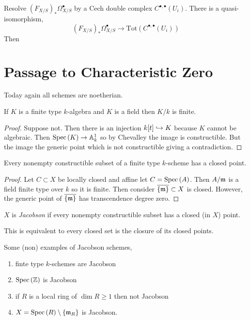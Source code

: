 \documentclass[12pt]{article}
\begin{document}
Resolve $(F_{X/S})_* \Omega^\bullet_{X/S}$ by a Cech double complex $C^{\bullet, \bullet}(U_i)$. There is a quasi-isomorphism,
\[ (F_{X/S})_* \Omega_{X/S}^\bullet \to \mathrm{Tot}\left( C^{\bullet, \bullet}(U_i) \right) \]
Then


\section{Passage to Characteristic Zero}

\begin{rmk}
Today again all schemes are noetherian.
\end{rmk}

\begin{prop}[Nullstellensatz]
If $K$ is a finite type $k$-algebra and $K$ is a field then $K/k$ is finite.
\end{prop}

\begin{proof}
Suppose not. Then there is an injection $k[t] \hookrightarrow K$ because $K$ cannot be algebraic. Then $\mathrm{Spec}\left( K \right) \to \mathbb{A}^1_k$ so by Chevalley the image is constructible. But the image the generic point which is not constructible giving a contradiction. 
\end{proof}

\begin{cor}
Every nonempty constructible subset of a finite type $k$-scheme has a closed point.
\end{cor}

\begin{proof}
Let $C \subset X$ be locally closed and affine let $C = \mathrm{Spec}\left( A \right)$. Then $A / \mathfrak{m}$ is a field finite type over $k$ so it is finite. Then consider $\overline{\{ \mathfrak{m} \}} \subset X$ is closed. However, the generic point of $\overline{ \{ \mathfrak{m} \} }$ has transcendence degree zero.  
\end{proof}

\begin{defn}
$X$ is \textit{Jacobson} if every nonempty constructible subset has a closed (in $X$) point.
\end{defn}

\begin{rmk}
This is equivalent to every closed set is the closure of its closed points.
\end{rmk}

\begin{example}
Some (non) examples of Jacobson schemes,
\begin{enumerate}
\item finte type $k$-schemes are Jacobson
\item $\mathrm{Spec}\left( \mathbb{Z} \right)$ is Jacobson
\item if $R$ is a local ring of $\dim{R} \ge 1$ then not Jacobson
\item $X = \mathrm{Spec}\left( R \right) \setminus \{ \mathfrak{m}_R \}$ is Jacobson.
\end{enumerate}
\end{example}
\end{document}
